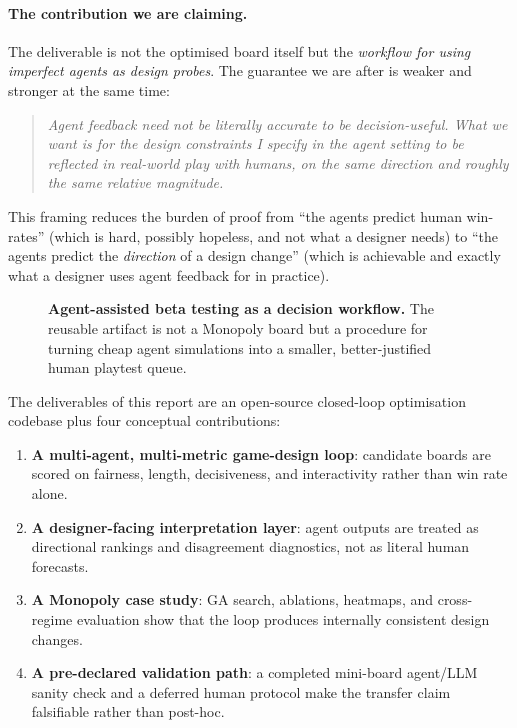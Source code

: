 \documentclass[10pt]{article}
\begin{document}
\paragraph{The contribution we are claiming.} The deliverable is not
the optimised board itself but the \emph{workflow for using imperfect
agents as design probes}. The guarantee we are after is weaker and
stronger at the same time:
\begin{quote}
\emph{Agent feedback need not be literally accurate to be decision-useful.
What we want is for the design constraints I specify in the agent
setting to be reflected in real-world play with humans, on the same
direction and roughly the same relative magnitude.}
\end{quote}
This framing reduces the burden of proof from ``the agents predict
human win-rates'' (which is hard, possibly hopeless, and not what a
designer needs) to ``the agents predict the \emph{direction} of a design
change'' (which is achievable and exactly what a designer uses agent
feedback for in practice).

\begin{figure}[h]
\centering
{}
\caption{\textbf{Agent-assisted beta testing as a decision workflow.}
The reusable artifact is not a Monopoly board but a procedure for
turning cheap agent simulations into a smaller, better-justified human
playtest queue.}
\label{fig:workflow}
\end{figure}

The deliverables of this report are an open-source closed-loop
optimisation codebase plus four conceptual contributions:
\begin{enumerate}[leftmargin=1.2em,itemsep=1pt]
\item \textbf{A multi-agent, multi-metric game-design loop}: candidate
boards are scored on fairness, length, decisiveness, and interactivity
rather than win rate alone.
\item \textbf{A designer-facing interpretation layer}: agent outputs are
treated as directional rankings and disagreement diagnostics, not as
literal human forecasts.
\item \textbf{A Monopoly case study}: GA search, ablations, heatmaps, and
cross-regime evaluation show that the loop produces internally
consistent design changes.
\item \textbf{A pre-declared validation path}: a completed mini-board
agent/LLM sanity check and a deferred human protocol make the transfer
claim falsifiable rather than post-hoc.
\end{enumerate}
\end{document}

